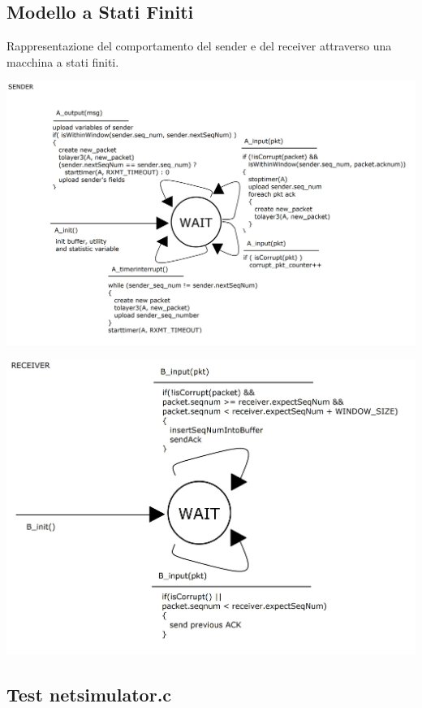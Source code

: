 \documentclass[a4paperr]{article}
\begin{document}
\subsection{Modello a Stati Finiti}
Rappresentazione del comportamento del sender e del receiver attraverso una macchina a stati finiti.\par
\includegraphics[width=\linewidth]{SchemaSender.jpg}\par
\includegraphics[width=\linewidth]{SchemaReceiver.jpg}

\newpage

\subsection{Test netsimulator.c}
\end{document}
